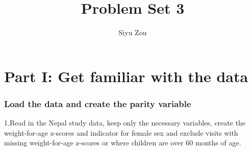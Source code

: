 \documentclass[
]{article}
\title{Problem Set 3}
\author{Siyu Zou}
\date{}
\newenvironment{Shaded}{\begin{snugshade}}{\end{snugshade}}
\newcommand{\AttributeTok}[1]{\textcolor[rgb]{0.13,0.29,0.53}{#1}}
\newcommand{\ConstantTok}[1]{\textcolor[rgb]{0.56,0.35,0.01}{#1}}
\newcommand{\DecValTok}[1]{\textcolor[rgb]{0.00,0.00,0.81}{#1}}
\newcommand{\FunctionTok}[1]{\textcolor[rgb]{0.13,0.29,0.53}{\textbf{#1}}}
\newcommand{\NormalTok}[1]{#1}
\newcommand{\SpecialCharTok}[1]{\textcolor[rgb]{0.81,0.36,0.00}{\textbf{#1}}}
\begin{document}
\maketitle

\begin{Shaded}
\end{Shaded}

\hypertarget{part-i-get-familiar-with-the-data}{%
\section{Part I: Get familiar with the
data}\label{part-i-get-familiar-with-the-data}}

\hypertarget{load-the-data-and-create-the-parity-variable}{%
\subsubsection{Load the data and create the parity
variable}\label{load-the-data-and-create-the-parity-variable}}

1.Read in the Nepal study data, keep only the necessary variables,
create the weight-for-age z-scores and indicator for female sex and
exclude visits with missing weight-for-age z-scores or where children
are over 60 months of age.
\end{document}
